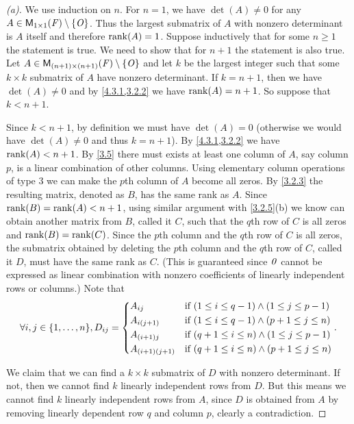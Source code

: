 \begin{proof}[(a)]
  We use induction on \(n\).
  For \(n = 1\), we have \(\det(A) \neq 0\) for any \(A \in \mathsf{M}_{{1} \times 1}({\mathit{F}}) \setminus \left\lbrace\mathit{O}\right\rbrace\).
  Thus the largest submatrix of \(A\) with nonzero determinant is \(A\) itself and therefore \(\rk{A} = 1\).
  Suppose inductively that for some \(n \geq 1\) the statement is true.
  We need to show that for \(n + 1\) the statement is also true.
  Let \(A \in \mathsf{M}_{{(n + 1)} \times (n + 1)}({\mathit{F}}) \setminus \left\lbrace\mathit{O}\right\rbrace\) and let \(k\) be the largest integer such that some \(k \times k\) submatrix of \(A\) have nonzero determinant.
  If \(k = n + 1\), then we have \(\det(A) \neq 0\) and by \cref{4.3.1,3.2.2} we have \(\rk{A} = n + 1\).
  So suppose that \(k < n + 1\).

  Since \(k < n + 1\), by definition we must have \(\det(A) = 0\) (otherwise we would have \(\det(A) \neq 0\) and thus \(k = n + 1\)).
  By \cref{4.3.1,3.2.2} we have \(\rk{A} < n + 1\).
  By \cref{3.5} there must exists at least one column of \(A\), say column \(p\), is a linear combination of other columns.
  Using elementary column operations of type 3 we can make the \(p\)th column of \(A\) become all zeros.
  By \cref{3.2.3} the resulting matrix, denoted as \(B\), has the same rank as \(A\).
  Since \(\rk{B} = \rk{A} < n + 1\), using similar argument with \cref{3.2.5}(b) we know can obtain another matrix from \(B\), called it \(C\), such that the \(q\)th row of \(C\) is all zeros and \(\rk{B} = \rk{C}\).
  Since the \(p\)th column and the \(q\)th row of \(C\) is all zeros, the submatrix obtained by deleting the \(p\)th column and the \(q\)th row of \(C\), called it \(D\), must have the same rank as \(C\).
  (This is guaranteed since \(\mathit{0}\) cannot be expressed as linear combination with nonzero coefficients of linearly independent rows or columns.)
  Note that
  \[
    \forall i, j \in \set{1, \dots, n}, D_{i j} = \begin{dcases}
      A_{i j}             & \text{if } (1 \leq i \leq q - 1) \land (1 \leq j \leq p - 1) \\
      A_{i (j + 1)}       & \text{if } (1 \leq i \leq q - 1) \land (p + 1 \leq j \leq n) \\
      A_{(i + 1) j}       & \text{if } (q + 1 \leq i \leq n) \land (1 \leq j \leq p - 1) \\
      A_{(i + 1) (j + 1)} & \text{if } (q + 1 \leq i \leq n) \land (p + 1 \leq j \leq n)
    \end{dcases}.
  \]

  We claim that we can find a \(k \times k\) submatrix of \(D\) with nonzero determinant.
  If not, then we cannot find \(k\) linearly independent rows from \(D\).
  But this means we cannot find \(k\) linearly independent rows from \(A\), since \(D\) is obtained from \(A\) by removing linearly dependent row \(q\) and column \(p\), clearly a contradiction.


\end{proof}
